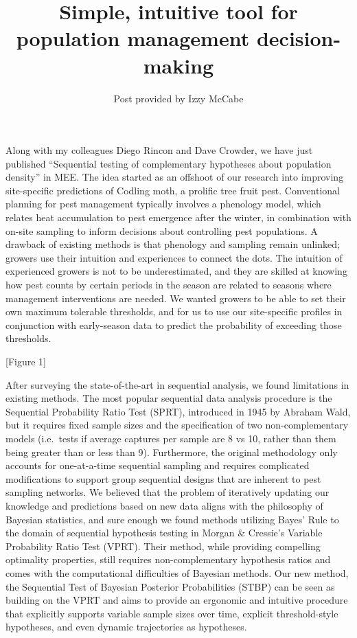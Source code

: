 \documentclass[
]{article}
\title{Simple, intuitive tool for population management decision-making}
\author{Post provided by Izzy McCabe}
\date{}
\begin{document}
\maketitle

Along with my colleagues Diego Rincon and Dave Crowder, we have just
published ``Sequential testing of complementary hypotheses about
population density'' in MEE. The idea started as an offshoot of our
research into improving site-specific predictions of Codling moth, a
prolific tree fruit pest. Conventional planning for pest management
typically involves a phenology model, which relates heat accumulation to
pest emergence after the winter, in combination with on-site sampling to
inform decisions about controlling pest populations. A drawback of
existing methods is that phenology and sampling remain unlinked; growers
use their intuition and experiences to connect the dots. The intuition
of experienced growers is not to be underestimated, and they are skilled
at knowing how pest counts by certain periods in the season are related
to seasons where management interventions are needed. We wanted growers
to be able to set their own maximum tolerable thresholds, and for us to
use our site-specific profiles in conjunction with early-season data to
predict the probability of exceeding those thresholds.

{[}Figure 1{]}

After surveying the state-of-the-art in sequential analysis, we found
limitations in existing methods. The most popular sequential data
analysis procedure is the Sequential Probability Ratio Test (SPRT),
introduced in 1945 by Abraham Wald, but it requires fixed sample sizes
and the specification of two non-complementary models (i.e.~tests if
average captures per sample are 8 vs 10, rather than them being greater
than or less than 9). Furthermore, the original methodology only
accounts for one-at-a-time sequential sampling and requires complicated
modifications to support group sequential designs that are inherent to
pest sampling networks. We believed that the problem of iteratively
updating our knowledge and predictions based on new data aligns with the
philosophy of Bayesian statistics, and sure enough we found methods
utilizing Bayes' Rule to the domain of sequential hypothesis testing in
Morgan \& Cressie's Variable Probability Ratio Test (VPRT). Their
method, while providing compelling optimality properties, still requires
non-complementary hypothesis ratios and comes with the computational
difficulties of Bayesian methods. Our new method, the Sequential Test of
Bayesian Posterior Probabilities (STBP) can be seen as building on the
VPRT and aims to provide an ergonomic and intuitive procedure that
explicitly supports variable sample sizes over time, explicit
threshold-style hypotheses, and even dynamic trajectories as hypotheses.
\end{document}
